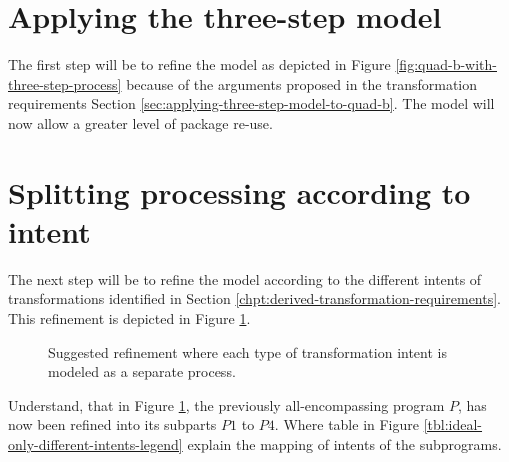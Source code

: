 \documentclass{scrreprt}
\begin{document}
\section{Applying the three-step model}
The first step will be to refine the model as depicted in Figure \ref{fig:quad-b-with-three-step-process} because of the arguments proposed in the transformation requirements Section \ref{sec:applying-three-step-model-to-quad-b}. The model will now allow a greater level of package re-use.


\section{Splitting processing according to intent}
The next step will be to refine the model according to the different intents of transformations identified in Section \ref{chpt:derived-transformation-requirements}. This refinement is depicted in Figure \ref{fig:ideal-only-different-intents}.

\begin{figure}[h]
  \centering


  \caption{Suggested refinement where each type of transformation intent is modeled as a separate process.}
  \label{fig:ideal-only-different-intents}
\end{figure}

Understand, that in Figure \ref{fig:ideal-only-different-intents}, the previously all-encompassing program $P$, has now been refined into its subparts $P1$ to $P4$. Where table in Figure \ref{tbl:ideal-only-different-intents-legend} explain the mapping of intents of the subprograms.
\end{document}
